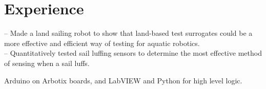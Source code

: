 \documentclass[]{deedy-resume-openfont}
\begin{document}
\begin{minipage}[t]{0.66\textwidth} 


\section{Experience}

-- Made a land sailing robot to show that land-based test surrogates could be a more effective and efficient way of testing for aquatic robotics. \\
-- Quantitatively tested sail luffing sensors to determine the most effective method of sensing when a sail luffs.
\sectionsep


Arduino on Arbotix boards, and LabVIEW and Python for high level logic.
\sectionsep



\end{minipage}
\end{document}
